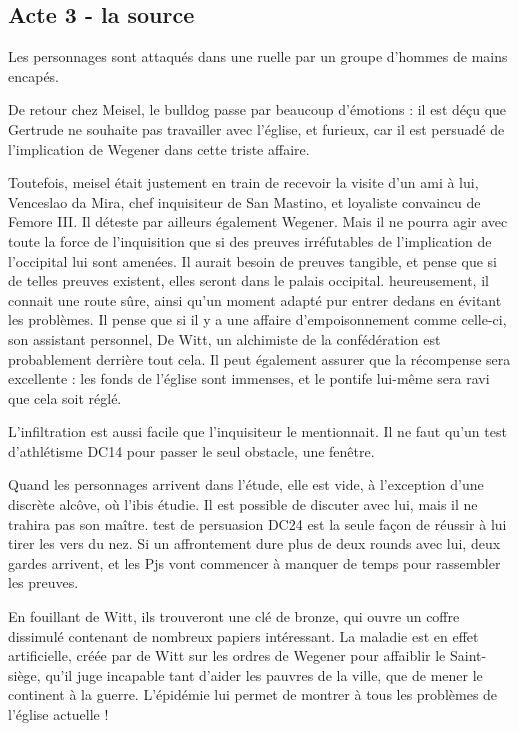 \documentclass[10pt,a4paper]{article}
\begin{document}
\subsection{Acte 3 - la source}
Les personnages sont attaqués dans une ruelle par un groupe d'hommes de mains encapés. 

De retour chez Meisel, le bulldog passe par beaucoup d'émotions : il est déçu que Gertrude ne souhaite pas travailler avec l'église, et furieux, car il est persuadé de l'implication de Wegener dans cette triste affaire.

Toutefois, meisel était justement en train de recevoir la visite d'un ami à lui, Venceslao da Mira, chef inquisiteur de San Mastino, et loyaliste convaincu de Femore III. Il déteste par ailleurs également Wegener. Mais il ne pourra agir avec toute la force de l'inquisition que si des preuves irréfutables de l'implication de l'occipital lui sont amenées. Il aurait besoin de preuves tangible, et pense que si de telles preuves existent, elles seront dans le palais occipital. heureusement, il connait une route sûre, ainsi qu'un moment adapté pur entrer dedans en évitant les problèmes. Il pense que si il y a une affaire d'empoisonnement comme celle-ci, son assistant personnel, De Witt, un alchimiste de la confédération est probablement derrière tout cela. Il peut également assurer que la récompense sera excellente : les fonds de l'église sont immenses, et le pontife lui-même sera ravi que cela soit réglé.

L'infiltration est aussi facile que l'inquisiteur le mentionnait. Il ne faut qu'un test d'athlétisme DC14 pour passer le seul obstacle, une fenêtre.

Quand les personnages arrivent dans l'étude, elle est vide, à l'exception d'une discrète alcôve, où l'ibis étudie. Il est possible de discuter avec lui, mais il ne trahira pas son maître. test de persuasion DC24 est la seule façon de réussir à lui tirer les vers du nez. Si un affrontement dure plus de deux rounds avec lui, deux gardes arrivent, et les Pjs vont commencer à manquer de temps pour rassembler les preuves.

En fouillant de Witt, ils trouveront une clé de bronze, qui ouvre un coffre dissimulé contenant de nombreux papiers intéressant. La maladie est en effet artificielle, créée par de Witt sur les ordres de Wegener pour affaiblir le Saint-siège, qu'il juge incapable tant d'aider les pauvres de la ville, que de mener le continent à la guerre. L'épidémie lui permet de montrer à tous les problèmes de l'église actuelle !
\end{document}

